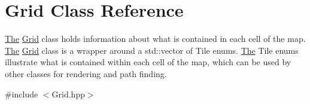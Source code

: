 \hypertarget{class_grid}{}\section{Grid Class Reference}
\label{class_grid}


\hyperlink{namespace_the}{The} \hyperlink{class_grid}{Grid} class holds information about what is contained in each cell of the map. \hyperlink{namespace_the}{The} \hyperlink{class_grid}{Grid} class is a wrapper around a std\+::vector of Tile enums. \hyperlink{namespace_the}{The} Tile enums illustrate what is contained within each cell of the map, which can be used by other classes for rendering and path finding.  




{\ttfamily \#include $<$Grid.\+hpp$>$}

